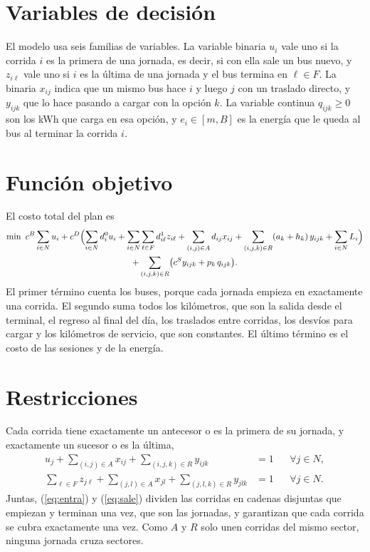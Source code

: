 \section{Variables de decisión}
\label{sec:variables}

El modelo usa seis familias de variables. La variable binaria \(u_i\) vale uno si la corrida \(i\) es la primera de una jornada, es decir, si con ella sale un bus nuevo, y \(z_{i\ell}\) vale uno si \(i\) es la última de una jornada y el bus termina en \(\ell\in F\). La binaria \(x_{ij}\) indica que un mismo bus hace \(i\) y luego \(j\) con un traslado directo, y \(y_{ijk}\) que lo hace pasando a cargar con la opción \(k\). La variable continua \(q_{ijk}\ge 0\) son los kWh que carga en esa opción, y \(e_i\in[m,B]\) es la energía que le queda al bus al terminar la corrida \(i\).

\section{Función objetivo}
\label{sec:objetivo}

El costo total del plan es
\begin{multline}
\min\ c^{B}\sum_{i\in N}u_i
+ c^{D}\Bigl(\sum_{i\in N}d^{0}_i u_i+\sum_{i\in N}\sum_{\ell\in F}d^{1}_{i\ell}z_{i\ell}
+\sum_{(i,j)\in A}d_{ij}x_{ij}+\sum_{(i,j,k)\in R}(a_k+h_k)\,y_{ijk}+\sum_{i\in N}L_i\Bigr)\\
+\sum_{(i,j,k)\in R}\bigl(c^{S}y_{ijk}+p_k\,q_{ijk}\bigr).
\label{eq:objetivo}
\end{multline}
El primer término cuenta los buses, porque cada jornada empieza en exactamente una corrida. El segundo suma todos los kilómetros, que son la salida desde el terminal, el regreso al final del día, los traslados entre corridas, los desvíos para cargar y los kilómetros de servicio, que son constantes. El último término es el costo de las sesiones y de la energía.

\section{Restricciones}
\label{sec:restricciones}

Cada corrida tiene exactamente un antecesor o es la primera de su jornada, y exactamente un sucesor o es la última,
\begin{align}
u_j+\sum_{(i,j)\in A}x_{ij}+\sum_{(i,j,k)\in R}y_{ijk} &= 1 && \forall j\in N, \label{eq:entra}\\
\sum_{\ell\in F}z_{j\ell}+\sum_{(j,l)\in A}x_{jl}+\sum_{(j,l,k)\in R}y_{jlk} &= 1 && \forall j\in N. \label{eq:sale}
\end{align}
Juntas, (\ref{eq:entra}) y (\ref{eq:sale}) dividen las corridas en cadenas disjuntas que empiezan y terminan una vez, que son las jornadas, y garantizan que cada corrida se cubra exactamente una vez. Como \(A\) y \(R\) solo unen corridas del mismo sector, ninguna jornada cruza sectores.

